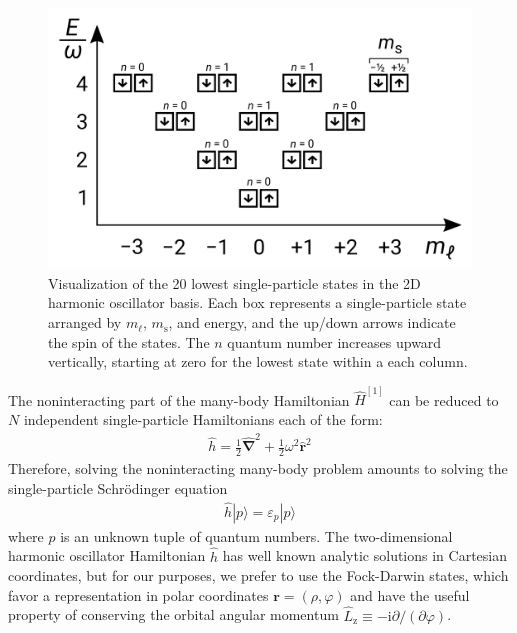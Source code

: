 \begin{figure}
  \includegraphics[width=\linewidth]{figures/fig-shell-structure-v2}
  \caption{Visualization of the 20 lowest single-particle states in the 2D harmonic oscillator basis.  Each box represents a single-particle state arranged by $m_\ell$, $m_{\mathrm{s}}$, and energy, and the up/down arrows indicate the spin of the states.  The $n$ quantum number increases upward vertically, starting at zero for the lowest state within a each column.}
  \label{fig:shell-structure}
\end{figure}

The noninteracting part of the many-body Hamiltonian $\hat{H}^{[1]}$ can be reduced to $N$ independent single-particle Hamiltonians each of the form:
\begin{align*}
  \hat{h} = \frac{1}{2} \hat{\bm{\nabla}}^2 + \frac{1}{2} \omega^2 \hat{\bm{r}}^2
\end{align*}
Therefore, solving the noninteracting many-body problem amounts to solving the single-particle Schr\"odinger equation
\begin{align*}
  \hat{h} |p\rangle = \varepsilon_p |p\rangle
\end{align*}
where $p$ is an unknown tuple of quantum numbers.  The two-dimensional harmonic oscillator Hamiltonian $\hat{h}$ has well known analytic solutions in Cartesian coordinates, but for our purposes, we prefer to use the Fock-Darwin states, which favor a representation in polar coordinates $\bm{r} = (\rho, \varphi)$ and have the useful property of conserving the orbital angular momentum $\hat{L}_{\mathrm{z}} \equiv -\mathrm{i} \partial / (\partial \varphi)$.

